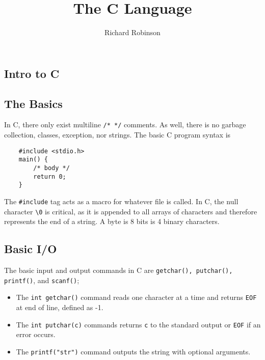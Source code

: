 \documentclass{tufte-book}
\title{The C Language}
\author{Richard Robinson}
\begin{document}
\maketitle
\tableofcontents
\setlength{\parindent}{0pt}
\begin{fullwidth}

\chapter{Intro to C}

\section{The Basics}
In C, there only exist multiline \lstinline{/* */} comments. As well, there is no garbage collection, classes, exception, nor strings. The basic C program syntax is
\begin{lstlisting}
    #include <stdio.h>
    main() {
        /* body */
        return 0;
    }
\end{lstlisting}
The \lstinline{#include} tag acts as a macro for whatever file is called. In C, the null character \lstinline{\0} is critical, as it is appended to all arrays of characters and therefore represents the end of a string. A byte is 8 bits is 4 binary characters.

\section{Basic I/O}
The basic input and output commands in C are \lstinline{getchar(), putchar(), printf()}, and \lstinline{scanf()};
\begin{itemize}
    \item The \lstinline{int getchar()} command reads one character at a time and returns \lstinline{EOF} at end of line, defined as -1.

    \item The \lstinline{int putchar(c)} commands returns \lstinline{c} to the standard output or \lstinline{EOF} if an error occurs.

    \item The \lstinline{printf("str")} command outputs the string with optional arguments.


\end{itemize}
\end{fullwidth}
\end{document}
